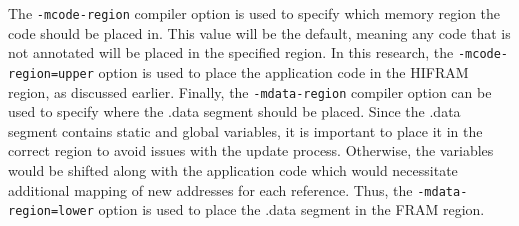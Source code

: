 The \verb|-mcode-region| compiler option is used to specify which memory region the code should be placed in. This value will be the default, meaning any code that is not annotated will be placed in the specified region. In this research, the \verb|-mcode-region=upper| option is used to place the application code in the HIFRAM region, as discussed earlier.
Finally, the \verb|-mdata-region| compiler option can be used to specify where the .data segment should be placed. Since the .data segment contains static and global variables, it is important to place it in the correct region to avoid issues with the update process. Otherwise, the variables would be shifted along with the application code which would necessitate additional mapping of new addresses for each reference. Thus, the \verb|-mdata-region=lower| option is used to place the .data segment in the FRAM region.
